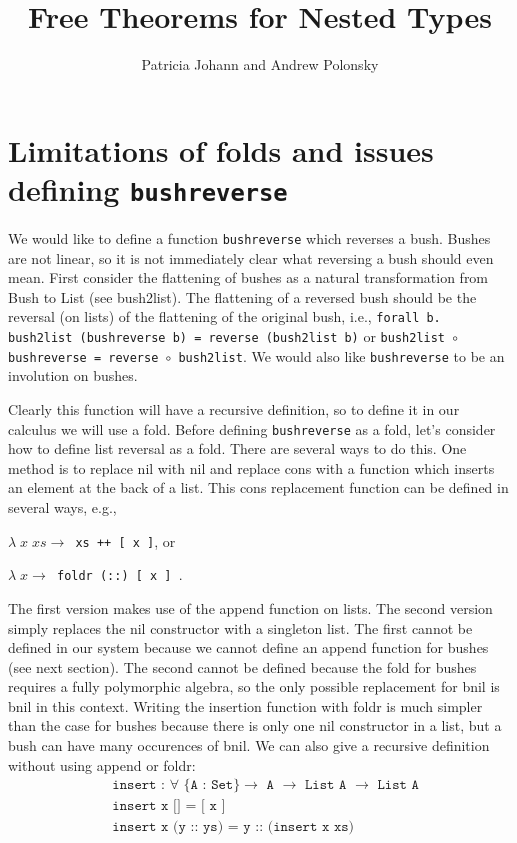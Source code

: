 \documentclass[acmsmall,review,anonymous]{acmart}
\title[Free Theorems for Nested Types]{Free Theorems for 
Nested Types} %
\author{Patricia Johann and Andrew Polonsky}
\affiliation{
  \institution{Appalachian State University}            %
}
\theoremstyle{definition}
\begin{document}
\begin{abstract}
\end{abstract}

\maketitle
\section{Limitations of folds and issues defining \texttt{bushreverse}}

We would like to define a function \texttt{bushreverse} which reverses a bush. 
Bushes are not linear, so it is not immediately clear what reversing a bush should even mean. 
First consider the flattening of bushes as a natural transformation from Bush to List (see bush2list). 
The flattening of a reversed bush should be the reversal (on lists) of the flattening of the original bush, 
i.e., \texttt{forall b. bush2list (bushreverse b) = reverse (bush2list b)} 
or \texttt{bush2list $\circ$ bushreverse = reverse $\circ$ bush2list}.
We would also like \texttt{bushreverse} to be an involution on bushes. 

Clearly this function will have a recursive definition, so to define it in our calculus we will use a fold. 
Before defining \texttt{bushreverse} as a fold, let's consider how to define list reversal as a fold. There are several ways to do this. 
One method is to replace nil with nil and replace cons with a function which inserts an element at the back of a list.
This cons replacement function can be defined in several ways, e.g.,

  \texttt{$\lambda \; x \; xs \to$ xs ++ [ x ]}, or

  \texttt{$\lambda \; x \to$ foldr (::) [ x ] }.

The first version makes use of the append function on lists. 
The second version simply replaces the nil constructor with a singleton list. 
The first cannot be defined in our system because we cannot define an append function for bushes (see next section). 
The second cannot be defined because the fold for bushes requires a fully polymorphic algebra, 
so the only possible replacement for bnil is bnil in this context. Writing the insertion function with foldr is
much simpler than the case for bushes because there is only one nil constructor in a list, but a bush
can have many occurences of bnil.
We can also give a recursive definition without using append or foldr:
\begin{align*}
  &\texttt{insert : $\forall$ \{A : Set\} $\to$ A $\to$ List A $\to$ List A} \\
  &\texttt{insert x [] = [ x ] } \\
  &\texttt{insert x (y :: ys) = y :: (insert x xs) } 
\end{align*}
\end{document}
